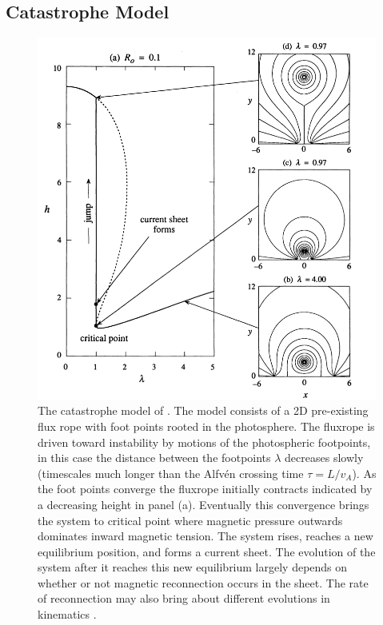 \subsection{Catastrophe Model}\label{sec:cat_model}
\begin{figure}[!t]
\begin{center}
\includegraphics[scale=0.4, trim=1cm 1cm 0cm 1.5cm]{images/catastrophe}
\caption[The catastrophe CME model]{The catastrophe model of \citet{forbes1995}. The model consists of a 2D pre-existing flux rope with foot points rooted in the photosphere. The fluxrope is driven toward instability by motions of the photospheric footpoints, in this case the distance between the footpoints $\lambda$ decreases slowly (timescales much longer than the Alfv\'{e}n crossing time $\tau=L/v_A$). As the foot points converge the fluxrope initially contracts indicated by a decreasing height in panel (a). Eventually this convergence brings the system to critical point where magnetic pressure outwards dominates inward magnetic tension. The system rises, reaches a new equilibrium position, and forms a current sheet. The evolution of the system after it reaches this new equilibrium largely depends on whether or not magnetic reconnection occurs in the sheet. The rate of reconnection may also bring about different evolutions in kinematics \citep{priest2000}.}
\label{fig:catastrophe}
\end{center}
\end{figure}

